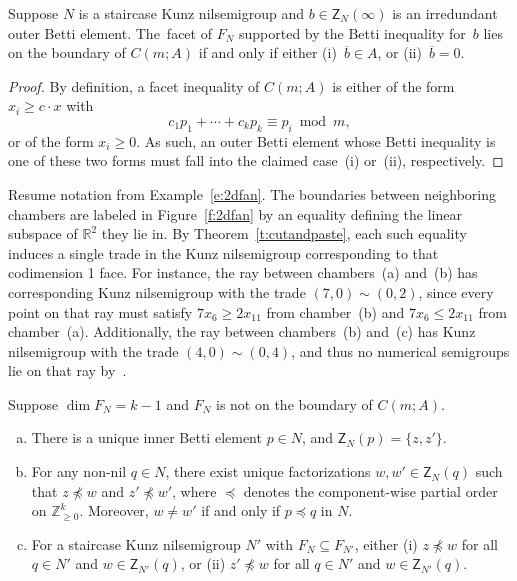 \documentclass[ALCO, Unicode]{cedram}
\newcommand\ZZ{\mathbb{Z}}
\newcommand\RR{\mathbb{R}}
\begin{document}
\begin{prop}\label{p:fanboundary}
Suppose $N$ is a staircase Kunz nilsemigroup and $b \in \mathsf Z_N(\infty)$ is an irredundant outer Betti element.  The~facet of $F_N$ supported by the Betti inequality for~$b$ lies on the boundary of $C(m;A)$ if and only if either (i)~$\overline b \in A$, or (ii)~$\overline b = 0$.  
\end{prop}

\begin{proof}
By definition, a facet inequality of $C(m;A)$ is either of the form $x_i \ge c \cdot x$ with 
$$c_1p_1 + \cdots + c_kp_k \equiv p_i \bmod m,$$
or of the form $x_i \ge 0$.  As such, an outer Betti element whose Betti inequality is one of these two forms must fall into the claimed case~(i) or~(ii), respectively.  
\end{proof}

\begin{exam}
Resume notation from Example~\ref{e:2dfan}.  The boundaries between neighboring chambers are labeled in Figure~\ref{f:2dfan} by an equality defining the linear subspace of $\RR^2$ they lie in.  By Theorem~\ref{t:cutandpaste}, each such equality induces a single trade in the Kunz nilsemigroup corresponding to that codimension 1 face.  For instance, the ray between chambers~(a) and~(b) has corresponding Kunz nilsemigroup with the trade $(7,0) \sim (0,2)$, since every point on that ray must satisfy $7x_6 \ge 2x_{11}$ from chamber~(b) and $7x_6 \le 2x_{11}$ from chamber~(a).  Additionally, the ray between chambers~(b) and~(c) has Kunz nilsemigroup with the trade $(4,0) \sim (0,4)$, and thus no numerical semigroups lie on that ray by~\cite[Corollary~3.16]{adventure5}.  
\end{exam}

\begin{thm}\label{t:cutandpaste}
Suppose $\dim F_N = k - 1$ and $F_N$ is not on the boundary of $C(m;A)$.  
\begin{enumerate}[(a)]
\item 
There is a unique inner Betti element $p \in N$, and $\mathsf Z_N(p) = \{z, z'\}$.  

\item 
For any non-nil $q \in N$, there exist unique factorizations $w, w' \in \mathsf Z_N(q)$ such that $z \not\preceq w$ and $z' \not\preceq w'$, where $\preceq$ denotes the component-wise partial order on $\ZZ_{\ge 0}^k$.  Moreover, $w \ne w'$ if and only if $p \preceq q$ in $N$.  

\item 
For a staircase Kunz nilsemigroup $N'$ with $F_N \subseteq F_{N'}$, either (i) $z \not\preceq w$ for all $q \in N'$ and $w \in \mathsf Z_{N'}(q)$, or (ii) $z' \not\preceq w$ for all $q \in N'$ and $w \in \mathsf Z_{N'}(q)$.  

\end{enumerate}
\end{thm}
\end{document}

